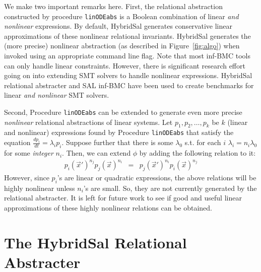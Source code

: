 \documentclass{llncs}
\def\linODEabs{\tt{linODEabs}}
\newcommand\ignore[1]{{}}
\begin{document}
We make two important remarks here.
First,
the relational abstraction constructed by 
procedure {\linODEabs} is a Boolean combination
of linear {\em{and nonlinear}} expressions.
By default, HybridSal generates conservative linear
approximations of these nonlinear relational invariants.
HybridSal generates the (more precise)
nonlinear abstraction (as described in Figure~\ref{fig:algo})
when invoked using an appropriate command line flag.
Note that most inf-BMC tools can only handle linear constraints.
However, there is significant research effort going on
into extending SMT solvers to handle nonlinear expressions.
HybridSal relational abstracter and SAL inf-BMC 
have been used to create benchmarks for 
linear {\em{and nonlinear}} SMT solvers.

Second, Procedure {\linODEabs} can be extended to
generate even more precise {\em{nonlinear}}
relational abstractions of linear systems.
Let $p_1, p_2, \ldots, p_k$ be $k$ (linear and nonlinear)
expressions found by Procedure {\linODEabs} that 
satisfy the equation $\frac{dp_i}{dt} = \lambda_i p_i$.
Suppose further that 
there is some $\lambda_0$ s.t.
for each $i$
$\lambda_i = n_i \lambda_0$ for some {\em{integer}} $n_i$.
Then, we can extend $\phi$ by adding the following relation to it:
\begin{eqnarray}
 p_i(\vec{x}')^{n_j} p_j(\vec{x})^{n_i}
 & = & p_j(\vec{x}')^{n_i}  p_i(\vec{x})^{n_j}
\label{eqn:nl}
\end{eqnarray}
\ignore{
The above relationship holds for any binary reachable
pair of states $(\vec{x},\vec{x'})$ 
because
$$
 \left(\frac{p_i(\vec{x}')}{p_i(\vec{x})}\right)^{n_j} 
 = 
 \left(\frac{p_j(\vec{x}')}{p_j(\vec{x})}\right)^{n_i} 
 =
 e^{n_in_j\lambda_0 t}
$$
\endignore}
However, since $p_i$'s are linear or quadratic 
expressions, the above relations will be highly
nonlinear unless $n_i$'s are small.  So, they are
not currently generated by the relational abstracter.
It is left for future work to see if good and useful
linear approximations of these highly nonlinear relations
can be obtained.

\section{The HybridSal Relational Abstracter}
\end{document}
